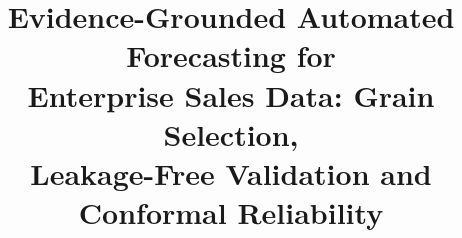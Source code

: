 \documentclass[conference]{IEEEtran}
\begin{document}
\title{Evidence-Grounded Automated Forecasting for\\Enterprise Sales Data: Grain Selection,\\Leakage-Free Validation and Conformal Reliability}

\author{
}

\maketitle
\end{document}

